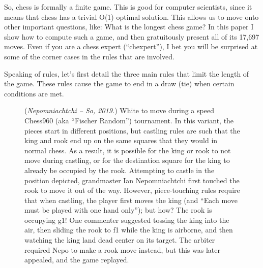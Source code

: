 \documentclass[twocolumn]{article}
\begin{document}
So, chess is formally a finite game. This is good for computer
scientists, since it means that chess has a trivial O(1) optimal
solution. This allows us to move onto other important questions, like:
What is the longest chess game? In this paper I show how to compute
such a game, and then gratuitously present all of its 17,697 
moves. Even if you are a chess expert (``chexpert''), I bet you
will be surprised at some of the corner cases in the rules that are
involved.

Speaking of rules, let's first detail the three main rules that limit
the length of the game. These rules cause the game to end in a draw
(tie) when certain conditions are met.

\begin{figure}[b!]
  \begin{center}
    \chessboard[
      marginbottom=false,margintop=false,
      setfen=2nr1r1k/pb1n1pqp/1p2p1p1/1N1pN3/5P2/1P4P1/P2PPQ1P/2R1K1RB,
      pgfstyle=curvemove,markmoves={e1-g1},
      pgfstyle=straightmove,markmoves={g1-f1},
      showmover=false]
  \end{center}
  \caption{ ({\it Nepomniachtchi -- So, 2019.}) White to move during a
    speed Chess960 (aka ``Fischer Random'') tournament. In this
    variant, the pieces start in different positions, but castling
    rules are such that the king and rook end up on the same squares
    that they would in normal chess. As a result, it is possible for
    the king or rook to not move during castling, or for the
    destination square for the king to already be occupied by the
    rook. Attempting to castle in the position depicted, grandmaster
    Ian Nepomniachtchi first touched the rook to move it out of the
    way. However, piece-touching rules require that when castling, the
    player first moves the king (and ``Each move must be played with
    one hand only''); but how? The rook is occupying g1! One commenter
    suggested tossing the king into the air, then sliding the rook to
    f1 while the king is airborne, and then watching the king land
    dead center on its target. The arbiter required Nepo to make a
    rook move instead, but this was later appealed, and the game
    replayed. } \label{fig:castle960}
\end{figure}

\end{document}
